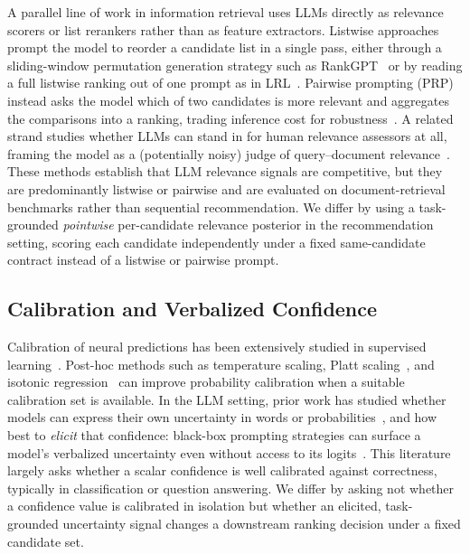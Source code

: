 A parallel line of work in information retrieval uses LLMs directly as
relevance scorers or list rerankers rather than as feature extractors.
Listwise approaches prompt the model to reorder a candidate list in a single
pass, either through a sliding-window permutation generation strategy such as
RankGPT~\cite{rankgpt} or by reading a full listwise ranking out of one
prompt as in LRL~\cite{lrl}. Pairwise prompting (PRP) instead asks the model
which of two candidates is more relevant and aggregates the comparisons into a
ranking, trading inference cost for robustness~\cite{prp}. A related strand
studies whether LLMs can stand in for human relevance assessors at all, framing
the model as a (potentially noisy) judge of query--document
relevance~\cite{faggioli2023perspectives}. These methods establish that LLM
relevance signals are competitive, but they are predominantly listwise or
pairwise and are evaluated on document-retrieval benchmarks rather than
sequential recommendation.
We differ by using a task-grounded \emph{pointwise} per-candidate relevance
posterior in the recommendation setting, scoring each candidate independently
under a fixed same-candidate contract instead of a listwise or pairwise prompt.

\subsection{Calibration and Verbalized Confidence}

Calibration of neural predictions has been extensively studied in supervised
learning~\cite{guo2017calibration,niculescu2005predicting}. Post-hoc methods
such as temperature scaling, Platt scaling~\cite{platt1999probabilistic}, and
isotonic regression~\cite{zadrozny2002transforming} can improve probability
calibration when a suitable calibration set is available. In the LLM setting,
prior work has studied whether models can express their own uncertainty in
words or probabilities~\cite{kadavath2022language,tian2023just,lin2022teaching},
and how best to \emph{elicit} that confidence: black-box prompting strategies
can surface a model's verbalized uncertainty even without access to its
logits~\cite{xiong2024can}. This literature largely asks whether a scalar
confidence is well calibrated against correctness, typically in classification
or question answering.
We differ by asking not whether a confidence value is calibrated in isolation
but whether an elicited, task-grounded uncertainty signal changes a downstream
ranking decision under a fixed candidate set.

